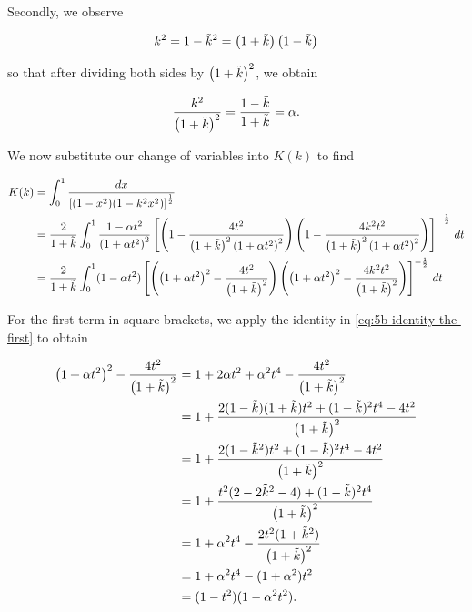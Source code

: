 \begin{solution}
  \pagebreak
  Secondly, we observe

  $$
    k^2 = 1 - \tilde{k}^2 = \left(1 + \tilde{k}\right)\left(1 - \tilde{k}\right)
  $$

  so that after dividing both sides by $\left(1 + \tilde{k}\right)^2$, we obtain

  \begin{equation} \label{eq:5b-identity-the-second}
    \frac{k^2}{\left(1 + \tilde{k}\right)^2} = \frac{1 - \tilde{k}}{1 + \tilde{k}} = \alpha.
  \end{equation}

  We now substitute our change of variables into $K(k)$ to find

  \begin{align*}
    K(k) &= \int_0^1 \frac{dx}{\left[(1 - x^2) (1 - k^2 x^2) \right]^{\frac{1}{2}}} \\
         &= \frac{2}{1 + \tilde{k}} \int_0^1 \frac{1 - \alpha t^2}{\left(1 + \alpha t^2\right)^2}
            \left[
              \left(
                1 - \frac{4t^2}{\left(1 + \tilde{k} \right)^2 \left(1 + \alpha t^2 \right)^2}
              \right)
              \left(
                1 - \frac{4k^2t^2}{\left(1 + \tilde{k} \right)^2 \left(1 + \alpha t^2 \right)^2}
              \right)
            \right]^{-\frac{1}{2}} \, dt \\
         &= \frac{2}{1 + \tilde{k}} \int_0^1 (1 - \alpha t^2)
            \left[
              \left(
                \left(1 + \alpha t^2\right)^2 - \frac{4t^2}{\left(1 + \tilde{k} \right)^2}
              \right)
              \left(
                \left(1 + \alpha t^2\right)^2 - \frac{4k^2t^2}{\left(1 + \tilde{k} \right)^2}
              \right)
            \right]^{-\frac{1}{2}} \, dt
  \end{align*}

  For the first term in square brackets, we apply the identity in \eqref{eq:5b-identity-the-first} to obtain

  \begin{align*}
    \left(1 + \alpha t^2\right)^2 - \frac{4t^2}{\left(1 + \tilde{k} \right)^2} 
      &= 1 + 2 \alpha t^2 + \alpha^2 t^4 - \frac{4t^2}{\left(1 + \tilde{k} \right)^2} \\ 
      &= 1 + \frac{2 (1 - \tilde{k})(1 + \tilde{k}) t^2 + (1 - \tilde{k})^2 t^4 - 4t^2}{\left(1 + \tilde{k} \right)^2} \\ 
      &= 1 + \frac{2 (1 - \tilde{k}^2) t^2 + (1 - \tilde{k})^2 t^4 - 4t^2}{\left(1 + \tilde{k} \right)^2} \\ 
      &= 1 + \frac{t^2(2 - 2\tilde{k}^2 - 4) + (1 - \tilde{k})^2 t^4}{\left(1 + \tilde{k} \right)^2} \\ 
      &= 1 + \alpha^2 t^4 - \frac{2 t^2(1 + \tilde{k}^2)}{\left(1 + \tilde{k} \right)^2} \\ 
      &= 1 + \alpha^2 t^4 - (1 + \alpha^2) t^2 \\
      &= (1 - t^2)(1 - \alpha^2 t^2).
  \end{align*}


\end{solution}
